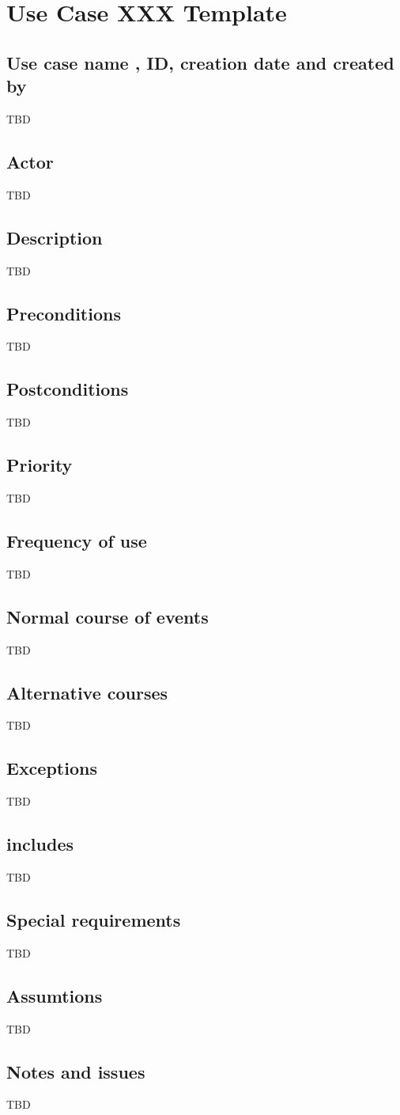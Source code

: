 \documentclass[a4paper]{article}
\begin{document}
\section{Use Case XXX Template}
\subsection{Use case name , ID, creation date and created by }
TBD
\subsection{Actor}
TBD
\subsection{Description}
TBD
\subsection{Preconditions}
TBD
\subsection{Postconditions}
TBD
\subsection{Priority}
TBD
\subsection{Frequency of use}
TBD
\subsection{Normal course of events}
TBD
\subsection{Alternative courses}
TBD
\subsection{Exceptions}
TBD
\subsection{includes}
TBD
\subsection{Special requirements}
TBD
\subsection{Assumtions}
TBD
\subsection{Notes and issues}
TBD
\end{document}

